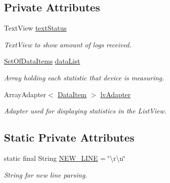 \subsection*{Private Attributes}
\begin{DoxyCompactItemize}
\item 
\mbox{\label{class_android_app_1_1_realtime_fragment_a8aa6530bcc9c6ef17627f1395ff7910d}} 
Text\+View \hyperlink{class_android_app_1_1_realtime_fragment_a8aa6530bcc9c6ef17627f1395ff7910d}{text\+Status}
\begin{DoxyCompactList}\small\item\em Text\+View to show amount of logs received. \end{DoxyCompactList}\item 
\mbox{\label{class_android_app_1_1_realtime_fragment_ab1c4983b61e50b501ed22842253bf849}} 
\hyperlink{class_android_app_1_1_set_of_data_items}{Set\+Of\+Data\+Items} \hyperlink{class_android_app_1_1_realtime_fragment_ab1c4983b61e50b501ed22842253bf849}{data\+List}
\begin{DoxyCompactList}\small\item\em Array holding each statistic that device is measuring. \end{DoxyCompactList}\item 
\mbox{\label{class_android_app_1_1_realtime_fragment_afeafb95e85d8ba0b9c50aa36af2f4216}} 
Array\+Adapter$<$ \hyperlink{class_android_app_1_1_data_item}{Data\+Item} $>$ \hyperlink{class_android_app_1_1_realtime_fragment_afeafb95e85d8ba0b9c50aa36af2f4216}{lv\+Adapter}
\begin{DoxyCompactList}\small\item\em Adapter used for displaying statistics in the List\+View. \end{DoxyCompactList}\end{DoxyCompactItemize}
\subsection*{Static Private Attributes}
\begin{DoxyCompactItemize}
\item 
\mbox{\label{class_android_app_1_1_realtime_fragment_a353558a83a489be25f413e3ea2451728}} 
static final String \hyperlink{class_android_app_1_1_realtime_fragment_a353558a83a489be25f413e3ea2451728}{N\+E\+W\+\_\+\+L\+I\+NE} = \char`\"{}\textbackslash{}r\textbackslash{}n\char`\"{}
\begin{DoxyCompactList}\small\item\em String for new line parsing. \end{DoxyCompactList}\end{DoxyCompactItemize}


